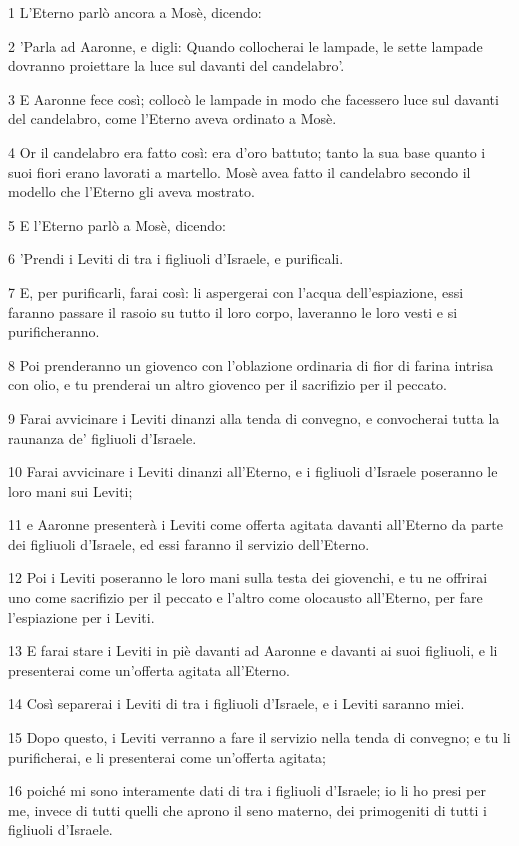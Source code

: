 \par 1 L'Eterno parlò ancora a Mosè, dicendo:
\par 2 'Parla ad Aaronne, e digli: Quando collocherai le lampade, le sette lampade dovranno proiettare la luce sul davanti del candelabro'.
\par 3 E Aaronne fece così; collocò le lampade in modo che facessero luce sul davanti del candelabro, come l'Eterno aveva ordinato a Mosè.
\par 4 Or il candelabro era fatto così: era d'oro battuto; tanto la sua base quanto i suoi fiori erano lavorati a martello. Mosè avea fatto il candelabro secondo il modello che l'Eterno gli aveva mostrato.
\par 5 E l'Eterno parlò a Mosè, dicendo:
\par 6 'Prendi i Leviti di tra i figliuoli d'Israele, e purificali.
\par 7 E, per purificarli, farai così: li aspergerai con l'acqua dell'espiazione, essi faranno passare il rasoio su tutto il loro corpo, laveranno le loro vesti e si purificheranno.
\par 8 Poi prenderanno un giovenco con l'oblazione ordinaria di fior di farina intrisa con olio, e tu prenderai un altro giovenco per il sacrifizio per il peccato.
\par 9 Farai avvicinare i Leviti dinanzi alla tenda di convegno, e convocherai tutta la raunanza de' figliuoli d'Israele.
\par 10 Farai avvicinare i Leviti dinanzi all'Eterno, e i figliuoli d'Israele poseranno le loro mani sui Leviti;
\par 11 e Aaronne presenterà i Leviti come offerta agitata davanti all'Eterno da parte dei figliuoli d'Israele, ed essi faranno il servizio dell'Eterno.
\par 12 Poi i Leviti poseranno le loro mani sulla testa dei giovenchi, e tu ne offrirai uno come sacrifizio per il peccato e l'altro come olocausto all'Eterno, per fare l'espiazione per i Leviti.
\par 13 E farai stare i Leviti in piè davanti ad Aaronne e davanti ai suoi figliuoli, e li presenterai come un'offerta agitata all'Eterno.
\par 14 Così separerai i Leviti di tra i figliuoli d'Israele, e i Leviti saranno miei.
\par 15 Dopo questo, i Leviti verranno a fare il servizio nella tenda di convegno; e tu li purificherai, e li presenterai come un'offerta agitata;
\par 16 poiché mi sono interamente dati di tra i figliuoli d'Israele; io li ho presi per me, invece di tutti quelli che aprono il seno materno, dei primogeniti di tutti i figliuoli d'Israele.
